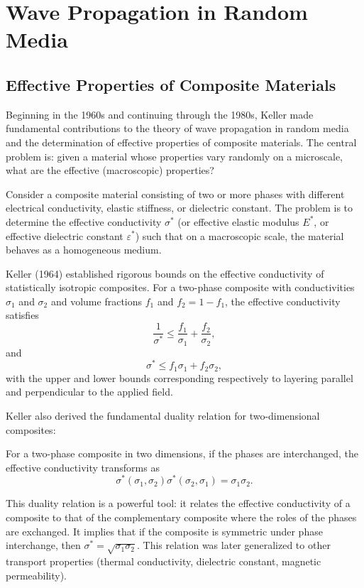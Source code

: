 \section{Wave Propagation in Random Media}

\subsection{Effective Properties of Composite Materials}

Beginning in the 1960s and continuing through the 1980s, Keller made fundamental contributions to the theory of wave propagation in random media and the determination of effective properties of composite materials. The central problem is: given a material whose properties vary randomly on a microscale, what are the effective (macroscopic) properties?

Consider a composite material consisting of two or more phases with different electrical conductivity, elastic stiffness, or dielectric constant. The problem is to determine the effective conductivity \(\sigma^*\) (or effective elastic modulus \(E^*\), or effective dielectric constant \(\varepsilon^*\)) such that on a macroscopic scale, the material behaves as a homogeneous medium.

Keller (1964) established rigorous bounds on the effective conductivity of statistically isotropic composites. For a two-phase composite with conductivities \(\sigma_1\) and \(\sigma_2\) and volume fractions \(f_1\) and \(f_2 = 1 - f_1\), the effective conductivity satisfies
\[
\frac{1}{\sigma^*} \leq \frac{f_1}{\sigma_1} + \frac{f_2}{\sigma_2},
\]
and
\[
\sigma^* \leq f_1\sigma_1 + f_2\sigma_2,
\]
with the upper and lower bounds corresponding respectively to layering parallel and perpendicular to the applied field.

Keller also derived the fundamental duality relation for two-dimensional composites:
\begin{theorem}
For a two-phase composite in two dimensions, if the phases are interchanged, the effective conductivity transforms as
\[
\sigma^*(\sigma_1, \sigma_2) \sigma^*(\sigma_2, \sigma_1) = \sigma_1 \sigma_2.
\]
\end{theorem}
This duality relation is a powerful tool: it relates the effective conductivity of a composite to that of the complementary composite where the roles of the phases are exchanged. It implies that if the composite is symmetric under phase interchange, then \(\sigma^* = \sqrt{\sigma_1 \sigma_2}\). This relation was later generalized to other transport properties (thermal conductivity, dielectric constant, magnetic permeability).

